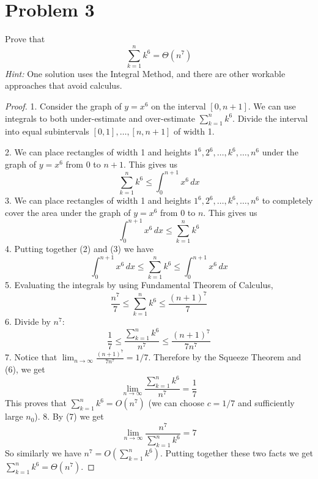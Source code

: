 \documentclass[14pt]{extarticle}
\begin{document}
\section{Problem 3}
Prove that
$$
\sum_{k=1}^n k^6 = \Theta(n^7)
$$
{\it Hint:} One solution uses the Integral Method, and there are other workable approaches that avoid calculus.
\begin{proof}
1. Consider the graph of $y = x^6$ on the interval $[0, n+1]$. We can use integrals to both under-estimate and over-estimate $\sum_{k=1}^n k^6$. Divide the interval into equal subintervals $[0,1], \ldots, [n,n+1]$ of width 1.

2. We can place rectangles of width 1 and heights $1^6, 2^6, \ldots, k^6, \ldots, n^6$ under the graph of $y = x^6$ from $0$ to $n+1$. This gives us
$$
\sum_{k=1}^n k^6 \leq \int_0^{n+1}x^6\,dx
$$
3. We can place rectangles of width 1 and heights $1^6, 2^6, \ldots, k^6, \ldots, n^6$ to completely cover the area under the graph of $y = x^6$ from $0$ to $n$. This gives us
$$
\int_0^{n+1}x^6\,dx \leq \sum_{k=1}^n k^6
$$
4. Putting together (2) and (3) we have
$$
\int_0^{n+1}x^6\,dx \leq \sum_{k=1}^n k^6 \leq \int_0^{n+1}x^6\,dx
$$
5. Evaluating the integrals by using Fundamental Theorem of Calculus,
$$
\frac{n^7}{7} \leq \sum_{k=1}^n k^6 \leq \frac{(n+1)^7}{7}
$$
6. Divide by $n^7$:
$$
\frac{1}{7} \leq \frac{\sum_{k=1}^n k^6}{n^7} \leq \frac{(n+1)^7}{7n^7}
$$
7. Notice that $\displaystyle \lim_{n \to \infty} \frac{(n+1)^7}{7n^7} = 1/7$. Therefore by the Squeeze Theorem and (6), we get
$$
\lim_{n \to \infty} \frac{\sum_{k=1}^n k^6}{n^7} = \frac{1}{7}
$$
This proves that $\sum_{k=1}^n k^6 = O(n^7)$ (we can choose $c = 1/7$ and sufficiently large $n_0$).
8. By (7) we get 
$$
\lim_{n \to \infty} \frac{n^7}{\sum_{k=1}^n k^6} = 7
$$
So similarly we have $n^7 = O(\sum_{k=1}^n k^6)$. Putting together these two facts we get $\sum_{k=1}^n k^6 = \Theta(n^7)$.
\end{proof}
\end{document}
